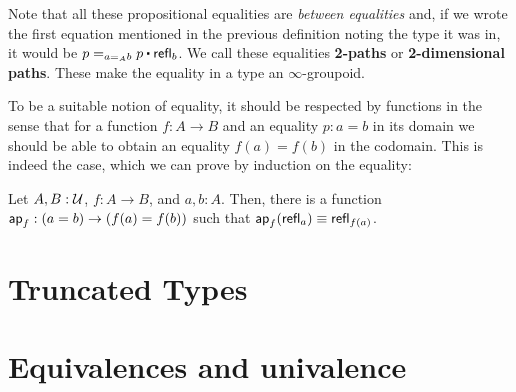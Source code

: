 Note that all these propositional equalities are \emph{between equalities} and,
if we wrote the first equation mentioned in the previous definition noting the
type it was in, it would be $p =_{a =_A b} p \ct \refl_b$.
We call these equalities \textbf{2-paths} or \textbf{2-dimensional paths}.
These make the equality in a type an $\infty$-groupoid.

To be a suitable notion of equality, it should be respected by functions in the
sense that for a function $f : A \to B$ and an equality $p : a = b$ in its domain
we should be able to obtain an equality $f(a) = f(b)$ in the codomain.
This is indeed the case, which we can prove by induction on the equality:
\begin{lemma}
Let $A, B : \mathcal{U}$, $f : A \to B$, and $a, b : A$. Then, there is a function
$\mathsf{ap}_f : (a = b) \to (f(a) = f(b))$ such that $\mathsf{ap}_f(\mathsf{refl}_a) \equiv \mathsf{refl}_{f(a)}$.
\end{lemma}

\section{Truncated Types}

\section{Equivalences and univalence}
